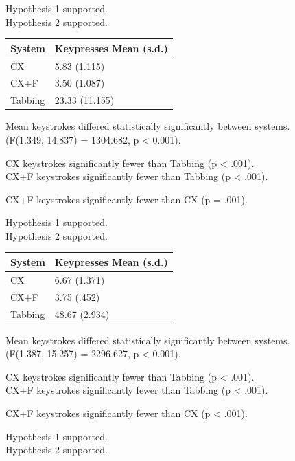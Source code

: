 \documentclass[11pt,openright,a4paper]{report}
\begin{document}
Hypothesis 1 supported.\\
Hypothesis 2 supported.

\begin{tabular}{l l}
\hline\hline %
System & Keypresses Mean (s.d.) \\ [0.5ex] %
\hline %
CX & 5.83 (1.115)\\
CX+F & 3.50 (1.087)\\
Tabbing & 23.33 (11.155)\\ [1ex] %
\hline %
\end{tabular}

Mean keystrokes differed statistically significantly between systems.\\
(F(1.349, 14.837) = 1304.682, p < 0.001).

CX keystrokes significantly fewer than Tabbing (p < .001).\\
CX+F keystrokes significantly fewer than Tabbing (p < .001).

CX+F keystrokes significantly fewer than CX (p = .001).

Hypothesis 1 supported.\\
Hypothesis 2 supported.

\begin{tabular}{l l}
\hline\hline %
System & Keypresses Mean (s.d.) \\ [0.5ex] %
\hline %
CX & 6.67 (1.371)\\
CX+F & 3.75 (.452)\\
Tabbing & 48.67 (2.934)\\ [1ex] %
\hline %
\end{tabular}

Mean keystrokes differed statistically significantly between systems.\\
(F(1.387, 15.257) = 2296.627, p < 0.001).

CX keystrokes significantly fewer than Tabbing (p < .001).\\
CX+F keystrokes significantly fewer than Tabbing (p < .001).

CX+F keystrokes significantly fewer than CX (p < .001).

Hypothesis 1 supported.\\
Hypothesis 2 supported.
\end{document}
